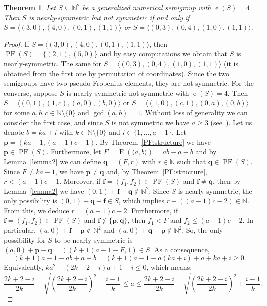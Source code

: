 \documentclass[12pt]{amsart}
\theoremstyle{plain}
\theoremstyle{theorem}
\newtheorem{theorem}[definition]{Theorem}
\theoremstyle{remark}
\begin{document}
\begin{theorem}
	Let $S\subseteq \mathbb{N}^2$ be a generalized numerical semigroup with $\operatorname{e}(S)=4$. Then $S$ is nearly-symmetric but not symmetric if and only if $S=\langle (3,0), (4,0), (0,1),(1,1)\rangle$ or $S=\langle (0,3), (0,4), (1,0),(1,1)\rangle$. 
\end{theorem}
\begin{proof}
	If $S=\langle (3,0), (4,0), (0,1),(1,1)\rangle$, then $\operatorname{PF}(S)=\{(2,1),(5,0)\}$ and by easy computations we obtain that $S$ is nearly-symmetric. The same for $S=\langle (0,3), (0,4), (1,0),(1,1)\rangle$ (it is obtained from the first one by permutation of coordinates). Since the two semigroups have two pseudo Frobenius elements, they are not symmetric. For the converse, suppose $S$ is nearly-symmetric not symmetric with $\operatorname{e}(S)=4$. Then $S=\langle (0,1),(1,c),(a,0),(b,0) \rangle$ or $S=\langle (1,0),(c,1),(0,a),(0,b) \rangle$ for some $a,b,c \in \mathbb{N}\setminus \{0\}$ and $\gcd(a,b)=1$. Without loss of generality we can consider the first case, and since $S$ is not symmetric we have $a\geq 3$ (see~\cite[Proposition 1.4]{Bhardwaj-Cisto2025}). Let us denote $b=ka+i$ with $k\in \mathbb{N}\setminus \{0\}$ and $i\in \{1,\ldots,a-1\}$. Let $\mathbf{p}=(ka-1,(a-1)c-1)$. 
    By Theorem~\ref{PF:structure} we have $\mathbf{p}\in \operatorname{PF}(S)$. Furthermore, let $F=\operatorname{F}(\langle a,b\rangle)=ab-a-b$ and by Lemma~\ref{lemma2} we can define $\mathbf{q}=(F,r)$ with $r\in \mathbb{N}$ such that $\mathbf{q}\in \operatorname{PF}(S)$. Since $F\neq ka-1$, we have $\mathbf{p}\neq \mathbf{q}$ and, by Theorem~\ref{PF:structure}, $r<(a-1)c-1$. Moreover, if $\mathbf{f}=(f_1,f_2)\in \operatorname{PF}(S)$ and $\mathbf{f}\neq \mathbf{q}$, then by Lemma~\ref{lemma2} we have $(0,1)+\mathbf{f}-\mathbf{q}\notin \mathbb{N}^2$. Since $S$ is nearly-symmetric, the only possibility is $(0,1)+\mathbf{q}-\mathbf{f}\in S$, which implies $r-((a-1)c-2)\in \mathbb{N}$. From this, we deduce $r=(a-1)c-2$. Furthermore, if $\mathbf{f}=(f_1,f_2)\in \operatorname{PF}(S)$ and $\mathbf{f}\notin \{\mathbf{p},\mathbf{q}\}$, then $f_1<F$ and $f_2\leq (a-1)c-2$. In particular, $(a,0)+\mathbf{f}-\mathbf{p}\notin \mathbb{N}^2$ and $(a,0)+\mathbf{q}-\mathbf{p}\notin \mathbb{N}^2$. So, the only possibility for $S$ to be nearly-symmetric is $(a,0)+\mathbf{p}-\mathbf{q}=((k+1)a-1-F,1)\in S$. As a consequence, $$(k+1)a-1-ab+a+b=(k+1)a-1-a(ka+i)+a+ka+i\geq 0.$$ Equivalently, $ka^2-(2k+2-i)a+1-i\leq 0$, which means:
	$$ \frac{2k+2-i}{2k}-\sqrt{\left( \frac{2k+2-i}{2k}\right)^2+\frac{i-1}{k}}\leq a \leq \frac{2k+2-i}{2k}+\sqrt{\left( \frac{2k+2-i}{2k}\right)^2+\frac{i-1}{k}}.$$ 

\end{proof}
\end{document}
